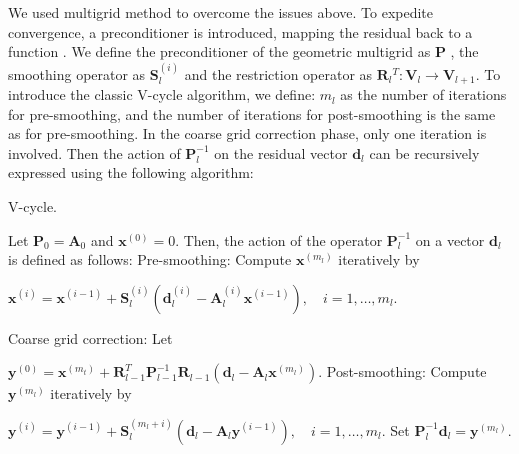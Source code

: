 \documentclass[extra, referee]{gji}
\begin{document}
We used multigrid method to overcome the issues above. To expedite convergence,
a preconditioner is introduced, mapping the residual back to a function
\citep{Janssen2011}. We define the preconditioner of the geometric multigrid as
$\mathbf{P}$ , the smoothing operator as $\mathbf{S}_l^{(i)}$ and the
restriction operator as $\mathbf{R}{_l}^{T}: \mathbf{V}_l \rightarrow
\mathbf{V}_{l+1}$. To introduce the classic V-cycle algorithm, we define: $m_l$
as the number of iterations for pre-smoothing, and the number of iterations for
post-smoothing is the same as for pre-smoothing. In the coarse grid correction
phase, only one iteration is involved. Then the action of $\mathbf{P}_l^{-1}$ on
the residual vector $\mathbf{d}_l$ can be recursively expressed using the
following algorithm:
\begin{algorithm}  %
    \caption{V-cycle.}  %
    \label{eq:algorithm1}

    \begin{algorithmic}[1] %
        \State Let $\mathbf{P}_0 = \mathbf{A}_0$ and $\mathbf{x}^{(0)} = 0$.
        Then, the action of the operator $\mathbf{P}_l^{-1}$ on a vector
        $\mathbf{d}_l$ is defined as follows: \State Pre-smoothing: Compute
        $\mathbf{x}^{(m_l)}$ iteratively by

        $\mathbf{x}^{(i)} = \mathbf{x}^{(i-1)} + \mathbf{S}^{(i)}
        _l(\mathbf{d}^{(i)}_l - \mathbf{A}^{(i)}_l \mathbf{x}^{(i-1)}), \quad i
        = 1, \ldots, m_l.$


         \State Coarse grid correction: Let

        $ \mathbf{y}^{(0)} = \mathbf{x}^{(m_t)} + \mathbf{R}^{T}_{l-1}
        \mathbf{P}^{-1}_{l-1} \mathbf{R}_{l-1} \left( \mathbf{d}_l -
        \mathbf{A}_l \mathbf{x}^{(m_l)} \right). $ \State Post-smoothing:
        Compute $\mathbf{y}^{(m_l)}$ iteratively by

        $\mathbf{y}^{(i)} = \mathbf{y}^{(i-1)} + \mathbf{S}^{(m_l+i)}_l \left(
        \mathbf{d}_l - \mathbf{A}_l \mathbf{y}^{(i-1)} \right), \quad i = 1,
        \ldots, m_l.$ \State Set $\mathbf{P}^{-1}_l \mathbf{d}_l =
        \mathbf{y}^{(m_l)}.$

    \end{algorithmic}
\end{algorithm}
\end{document}
